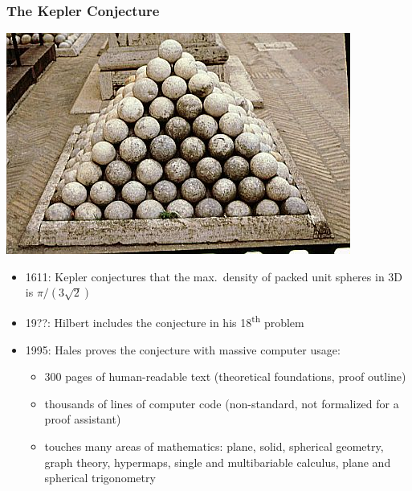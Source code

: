\documentclass[pdftex]{beamer}
\begin{document}
\begin{frame}
  \frametitle{The Kepler Conjecture}
  \begin{center}
      \includegraphics[width=.3\textwidth]{images/cannonballs.jpg}
  \end{center}
  \vspace{-1ex}
      \begin{itemize}
      \item 1611: Kepler conjectures that the max.\ density of packed unit
        spheres in 3D is $\pi/(3\sqrt{2})$
      \item 19??: Hilbert includes the conjecture in his 18\textsuperscript{th} problem
      \item 1995: Hales proves the conjecture with massive computer usage:
        \begin{itemize}
        \item 300 pages of human-readable text (theoretical foundations, proof outline)
        \item thousands of lines of computer code (non-standard, not formalized
          for a proof assistant)
        \item touches many areas of mathematics: plane, solid, spherical
          geometry, graph theory, hypermaps, single and multibariable calculus,
          plane and spherical trigonometry
        \end{itemize}
      \end{itemize}
\end{frame}
\end{document}
